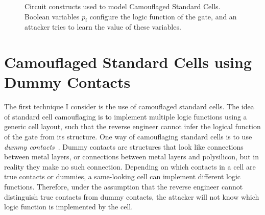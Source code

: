 \documentclass[proposal]{umassthesis}  %
\begin{document}
  \begin{figure}[!ht]
  \centering
    \caption{Circuit constructs used to model Camouflaged Standard Cells. Boolean variables $p_i$ configure the logic function of the gate, and an attacker tries to learn the value of these variables.}
    \label{fig:select}
  \end{figure}























\section{Camouflaged Standard Cells using Dummy Contacts}
The first technique I consider is the use of camouflaged standard cells. The idea of standard cell camouflaging is to implement multiple logic functions using a generic cell layout, such that the reverse engineer cannot infer the logical function of the gate from its structure. One way of camouflaging standard cells is to use \textit{dummy contacts}~\cite{chow-2007-integrated}. Dummy contacts are structures that look like connections between metal layers, or connections between metal layers and polysilicon, but in reality they make no such connection. Depending on which contacts in a cell are true contacts or dummies, a same-looking cell can implement different logic functions. Therefore, under the assumption that the reverse engineer cannot distinguish true contacts from dummy contacts, the attacker will not know which logic function is implemented by the cell.
\end{document}
